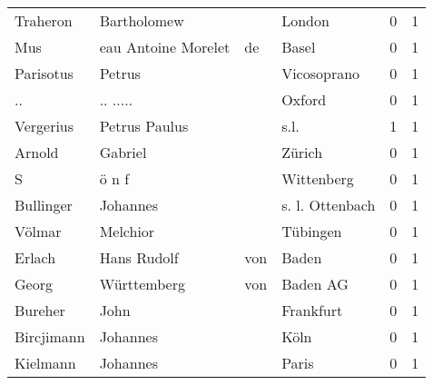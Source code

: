 \documentclass[10pt,a4paper,landscape]{article}
\begin{document}
\begin{longtable}{llllrr}
                 Traheron &                        Bartholomew &             &                                      London &          0 &         1 \\
                      Mus &                eau Antoine Morelet &          de &                                       Basel &          0 &         1 \\
                Parisotus &                             Petrus &             &                                 Vicosoprano &          0 &         1 \\
                       .. &                           .. ..... &             &                                      Oxford &          0 &         1 \\
                Vergerius &                      Petrus Paulus &             &                                        s.l. &          1 &         1 \\
                   Arnold &                            Gabriel &             &                                      Zürich &          0 &         1 \\
                        S &                              ö n f &             &                                  Wittenberg &          0 &         1 \\
                Bullinger &                           Johannes &             &                             s. l. Ottenbach &          0 &         1 \\
                   Völmar &                           Melchior &             &                                    Tübingen &          0 &         1 \\
                   Erlach &                        Hans Rudolf &         von &                                       Baden &          0 &         1 \\
                    Georg &                        Württemberg &         von &                                    Baden AG &          0 &         1 \\
                  Bureher &                               John &             &                                   Frankfurt &          0 &         1 \\
               Bircjimann &                           Johannes &             &                                        Köln &          0 &         1 \\
                 Kielmann &                           Johannes &             &                                       Paris &          0 &         1 \\

\end{longtable}
\end{document}
